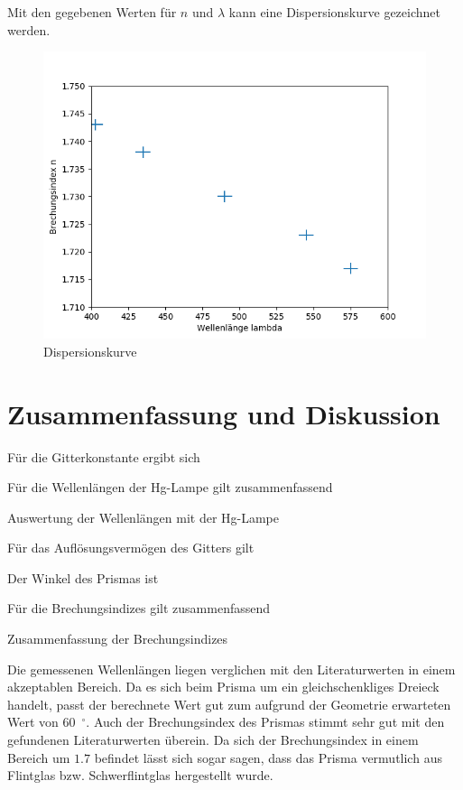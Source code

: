 \documentclass{article}
\begin{document}
Mit den gegebenen Werten für $n$ und $\lambda$ kann eine Dispersionskurve gezeichnet werden.
\begin{figure}[H]
\label{fig:dispersion}
\includegraphics[scale=0.7]{kurve.png}
\caption{Dispersionskurve}
\end{figure}

\section{Zusammenfassung und Diskussion}

Für die Gitterkonstante ergibt sich


Für die Wellenlängen der Hg-Lampe gilt zusammenfassend
\begin{table}[H]
\caption{Auswertung der Wellenlängen mit der Hg-Lampe}
\centering

\end{table}

Für das Auflösungsvermögen des Gitters gilt


Der Winkel des Prismas ist



Für die Brechungsindizes gilt zusammenfassend
\begin{table}[H]
\caption{Zusammenfassung der Brechungsindizes}
\centering

\end{table}




Die gemessenen Wellenlängen liegen verglichen mit den Literaturwerten \cite{other} in einem akzeptablen Bereich.
Da es sich beim Prisma um ein gleichschenkliges Dreieck handelt, passt der berechnete Wert gut zum aufgrund der Geometrie erwarteten Wert von 60~${}^\circ$.
Auch der Brechungsindex des Prismas stimmt sehr gut mit den gefundenen Literaturwerten \cite{wiki} überein. Da sich der Brechungsindex in einem Bereich um $1.7$ befindet lässt sich sogar sagen, dass das Prisma vermutlich aus Flintglas bzw. Schwerflintglas hergestellt wurde.
\end{document}
